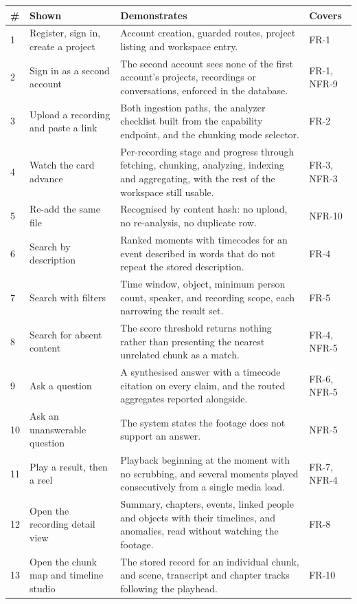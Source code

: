 \documentclass[11pt,a4paper]{article}
\begin{document}
\begin{table}[htbp]
\centering
\small
\begin{tabularx}{\textwidth}{@{}L{0.7cm}L{3.4cm}XL{1.9cm}@{}}
\toprule
\textbf{\#} & \textbf{Shown} & \textbf{Demonstrates} & \textbf{Covers} \\
 & Register, sign in, create a project & Account creation, guarded routes, project listing and workspace entry. & FR-1 \\
2 & Sign in as a second account & The second account sees none of the first account's projects, recordings or conversations, enforced in the database. & FR-1, NFR-9 \\
3 & Upload a recording and paste a link & Both ingestion paths, the analyzer checklist built from the capability endpoint, and the chunking mode selector. & FR-2 \\
4 & Watch the card advance & Per-recording stage and progress through fetching, chunking, analyzing, indexing and aggregating, with the rest of the workspace still usable. & FR-3, NFR-3 \\
5 & Re-add the same file & Recognised by content hash: no upload, no re-analysis, no duplicate row. & NFR-10 \\
6 & Search by description & Ranked moments with timecodes for an event described in words that do not repeat the stored description. & FR-4 \\
7 & Search with filters & Time window, object, minimum person count, speaker, and recording scope, each narrowing the result set. & FR-5 \\
8 & Search for absent content & The score threshold returns nothing rather than presenting the nearest unrelated chunk as a match. & FR-4, NFR-5 \\
9 & Ask a question & A synthesised answer with a timecode citation on every claim, and the routed aggregates reported alongside. & FR-6, NFR-5 \\
10 & Ask an unanswerable question & The system states the footage does not support an answer. & NFR-5 \\
11 & Play a result, then a reel & Playback beginning at the moment with no scrubbing, and several moments played consecutively from a single media load. & FR-7, NFR-4 \\
12 & Open the recording detail view & Summary, chapters, events, linked people and objects with their timelines, and anomalies, read without watching the footage. & FR-8 \\
13 & Open the chunk map and timeline studio & The stored record for an individual chunk, and scene, transcript and chapter tracks following the playhead. & FR-10 \\

\end{tabularx}
\end{table}
\end{document}
